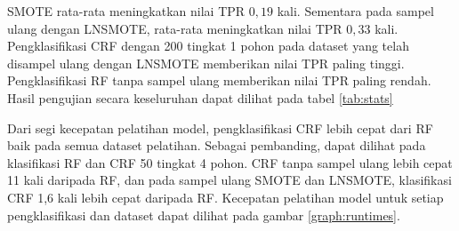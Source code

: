 

SMOTE rata-rata meningkatkan nilai TPR $0,19$ kali.
Sementara pada sampel ulang dengan LNSMOTE, rata-rata meningkatkan nilai TPR
$0,33$ kali.
Pengklasifikasi CRF dengan 200 tingkat 1 pohon pada dataset yang telah disampel
ulang dengan LNSMOTE memberikan nilai TPR paling tinggi.
Pengklasifikasi RF tanpa sampel ulang memberikan nilai TPR paling rendah.
Hasil pengujian secara keseluruhan dapat dilihat pada tabel \ref{tab:stats}



Dari segi kecepatan pelatihan model, pengklasifikasi CRF lebih cepat dari RF
baik pada semua dataset pelatihan.
Sebagai pembanding, dapat dilihat pada klasifikasi RF dan CRF 50 tingkat 4
pohon.
CRF tanpa sampel ulang lebih cepat 11 kali daripada RF, dan pada sampel ulang
SMOTE dan LNSMOTE, klasifikasi CRF 1,6 kali lebih cepat daripada RF.
Kecepatan pelatihan model untuk setiap pengklasifikasi dan dataset dapat
dilihat pada gambar \ref{graph:runtimes}.
